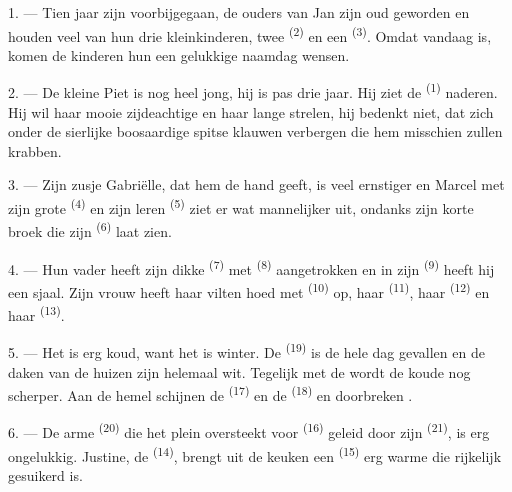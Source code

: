 \VUsaut{3.0mm}

1. --- Tien jaar zijn voorbijgegaan, de ouders van Jan zijn oud geworden en houden veel van
hun drie kleinkinderen, twee  \textsuperscript{(2)} en een
 \textsuperscript{(3)}. Omdat vandaag
 is, komen de kinderen hun een gelukkige naamdag wensen.

2. --- De kleine Piet is nog heel jong, hij is pas drie jaar. Hij ziet de
 \textsuperscript{(1)} naderen. Hij wil haar mooie zijdeachtige
 en haar lange  strelen, hij bedenkt niet, dat zich
onder de sierlijke  boosaardige spitse klauwen verbergen die hem misschien
zullen krabben.

3. --- Zijn zusje Gabriëlle, dat hem de hand geeft, is veel ernstiger en Marcel met zijn grote
 \textsuperscript{(4)} en zijn leren
 \textsuperscript{(5)} ziet er wat mannelijker uit, ondanks zijn
korte broek die zijn  \textsuperscript{(6)} laat zien.

4. --- Hun vader heeft zijn dikke  \textsuperscript{(7)} met
 \textsuperscript{(8)} aangetrokken en in zijn 
\textsuperscript{(9)} heeft hij een sjaal. Zijn vrouw heeft haar vilten hoed met
 \textsuperscript{(10)} op, haar 
\textsuperscript{(11)}, haar  \textsuperscript{(12)} en haar
 \textsuperscript{(13)}.

5. --- Het is erg koud, want het is winter. De  \textsuperscript{(19)} is
de hele dag gevallen en de daken van de huizen zijn helemaal wit. Tegelijk met de
 wordt de koude nog scherper. Aan de hemel schijnen de 
\textsuperscript{(17)} en de  \textsuperscript{(18)} en doorbreken
.

\VUsaut{4.2mm}
\VUsaut{3.0mm}

6. --- De arme  \textsuperscript{(20)} die het plein oversteekt voor
 \textsuperscript{(16)} geleid door zijn
 \textsuperscript{(21)}, is erg ongelukkig. Justine, de
 \textsuperscript{(14)}, brengt uit de keuken een
 \textsuperscript{(15)} erg warme  die rijkelijk
gesuikerd is.

